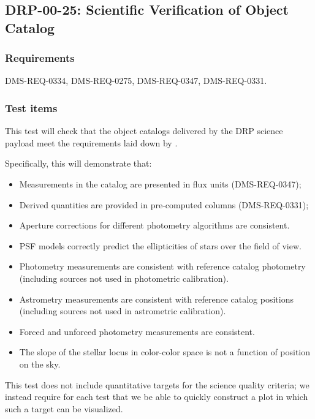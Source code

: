 \subsection{DRP-00-25: Scientific Verification of Object Catalog}
\label{drp-00-25}

\subsubsection{Requirements}

DMS-REQ-0334, DMS-REQ-0275, DMS-REQ-0347, DMS-REQ-0331.

\subsubsection{Test items}
\label{drp-00-25-items}

This test will check that the object catalogs delivered by the DRP science
payload meet the requirements laid down by .

Specifically, this will demonstrate that:

\begin{itemize}

  \item{Measurements in the catalog are presented in flux units
  (DMS-REQ-0347);}
  \item{Derived quantities are provided in pre-computed columns
  (DMS-REQ-0331);}
  \item{Aperture corrections for different photometry algorithms are consistent.}
  \item{PSF models correctly predict the ellipticities of stars over the field of view.}
  \item{Photometry measurements are consistent with reference catalog photometry (including sources not used in photometric calibration).}
  \item{Astrometry measurements are consistent with reference catalog positions (including sources not used in astrometric calibration).}
  \item{Forced and unforced photometry measurements are consistent.}
  \item{The slope of the stellar locus in color-color space is not a function of position on the sky.}

\end{itemize}

This test does not include quantitative targets for the science quality criteria; we instead require for each test that we be able to quickly construct a plot in which such a target can be visualized.

